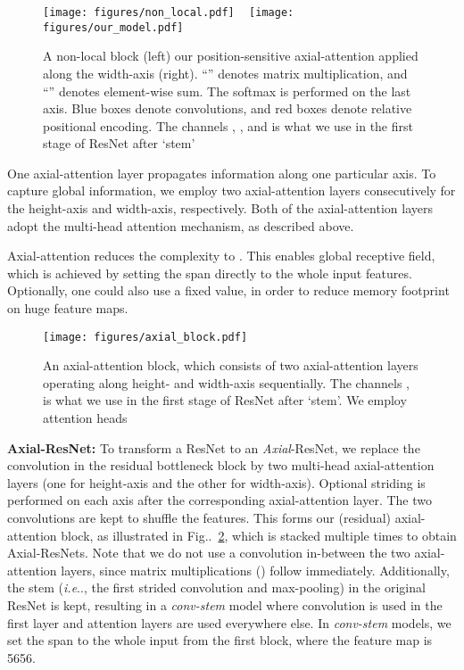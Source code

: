 \documentclass[runningheads]{llncs}
\makeatletter
\DeclareRobustCommand\onedot{\futurelet\@let@token\@onedot}
\def\@onedot{\ifx\@let@token.\else.\null\fi\xspace}
\def\ie{\emph{i.e}\onedot} \def\Ie{\emph{I.e}\onedot}
\newcommand{\figref}[1]{Fig\onedot~\ref{#1}}
\makeatother
\begin{document}
\begin{figure}[!t]
    \centering
    \texttt{[image: figures/non\_local.pdf]}
    ~
    \texttt{[image: figures/our\_model.pdf]}
    \caption{A non-local block (left) \vs our position-sensitive axial-attention applied along the width-axis (right). ``'' denotes matrix multiplication, and ``'' denotes element-wise sum. The softmax is performed on the last axis. Blue boxes denote  convolutions, and red boxes denote relative positional encoding. The channels , , and  is what we use in the first stage of ResNet after `stem'}
    \label{fig:axial_layer}
\end{figure}

One axial-attention layer propagates information along one particular axis. To capture global information, we employ two axial-attention layers consecutively for the height-axis and width-axis, respectively. Both of the axial-attention layers adopt the multi-head attention mechanism, as described above.

Axial-attention reduces the complexity to . This enables global receptive field, which is achieved by setting the span  directly to the whole input features. Optionally, one could also use a fixed  value, in order to reduce memory footprint on huge feature maps.
\begin{figure}[!t]
    \centering
    \texttt{[image: figures/axial\_block.pdf]}
    \caption{An axial-attention block, which consists of two axial-attention layers operating along height- and width-axis sequentially. The channels ,  is what we use in the first stage of ResNet after `stem'. We employ  attention heads}
    \label{fig:axial_block}
\end{figure}

{\bf Axial-ResNet:} To transform a ResNet \cite{he2016deep} to an {\it Axial}-ResNet, we replace the  convolution in the residual bottleneck block by two multi-head axial-attention layers (one for height-axis and the other for width-axis). Optional striding is performed on each axis after the corresponding axial-attention layer. The two  convolutions are kept to shuffle the features. This forms our (residual) axial-attention block, as illustrated in \figref{fig:axial_block}, which is stacked multiple times to obtain Axial-ResNets. Note that we do not use a  convolution in-between the two axial-attention layers, since matrix multiplications () follow immediately. Additionally, the stem (\ie, the first strided  convolution and  max-pooling) in the original ResNet is kept, resulting in a {\it conv-stem} model where convolution is used in the first layer and attention layers are used everywhere else. In {\it conv-stem} models, we set the span  to the whole input from the first block, where the feature map is 5656.
\end{document}
